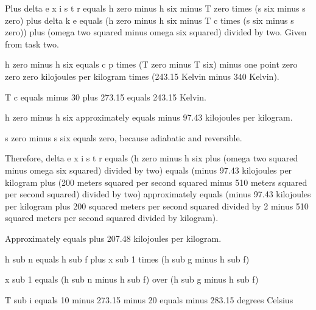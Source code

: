 Plus delta e x i s t r equals h zero minus h six minus T zero times (s six minus s zero) plus delta k e equals (h zero minus h six minus T c times (s six minus s zero)) plus (omega two squared minus omega six squared) divided by two. Given from task two.

h zero minus h six equals c p times (T zero minus T six) minus one point zero zero zero kilojoules per kilogram times (243.15 Kelvin minus 340 Kelvin).

T c equals minus 30 plus 273.15 equals 243.15 Kelvin.

h zero minus h six approximately equals minus 97.43 kilojoules per kilogram.

s zero minus s six equals zero, because adiabatic and reversible.

Therefore, delta e x i s t r equals (h zero minus h six plus (omega two squared minus omega six squared) divided by two) equals (minus 97.43 kilojoules per kilogram plus (200 meters squared per second squared minus 510 meters squared per second squared) divided by two) approximately equals (minus 97.43 kilojoules per kilogram plus 200 squared meters per second squared divided by 2 minus 510 squared meters per second squared divided by kilogram). 

Approximately equals plus 207.48 kilojoules per kilogram.

h sub n equals h sub f plus x sub 1 times (h sub g minus h sub f)

x sub 1 equals (h sub n minus h sub f) over (h sub g minus h sub f)

T sub i equals 10 minus 273.15 minus 20 equals minus 283.15 degrees Celsius